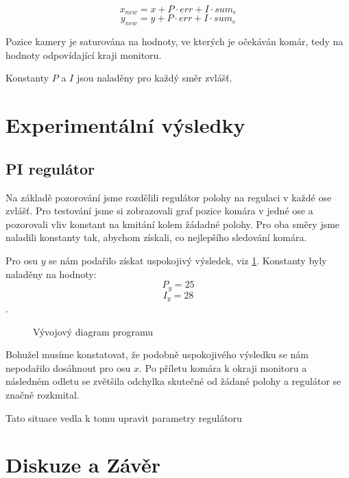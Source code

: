 \documentclass[a4paper,10pt]{article}
\begin{document}
		$$x_{new} = x + P\cdot err + I\cdot sum_e$$
		$$y_{new} = y + P\cdot err + I\cdot sum_e$$

		Pozice kamery je saturována na hodnoty, ve
		kterých je očekáván komár, tedy na hodnoty odpovídající kraji monitoru.

		Konstanty $P$ a $I$ jsou naladěny pro každý směr zvlášť.
		




\section{Experimentální výsledky}

\subsection{PI regulátor}

Na základě pozorování jsme rozdělili regulátor polohy na regulaci v každé ose zvlášť.
Pro testování jsme si zobrazovali graf pozice komára v jedné ose a pozorovali vliv konstant na kmitání kolem žádadné polohy. 
Pro oba směry jsme naladili konstanty tak, abychom získali, co nejlepšího sledování komára.

Pro osu $y$ se nám podařilo získat uspokojivý výsledek, viz \ref{fig:osay}. Konstanty byly naladěny na hodnoty:
$$P_y = 25$$
$$I_y = 28$$.

\begin{figure}[!h]
	\centering
	\caption{Vývojový diagram programu}\label{fig:osay}
\end{figure}

Bohužel musíme konstatovat, že podobně uspokojivého výsledku se nám nepodařilo dosáhnout pro osu $x$. 
Po příletu komára k okraji monitoru a následném odletu se zvětšila odchylka skutečné od žádané polohy 
a regulátor se značně rozkmital. 

Tato situace vedla k tomu upravit parametry regulátoru


\section{Diskuze a Závěr}



\end{document}
